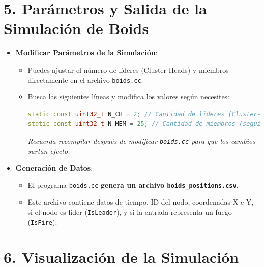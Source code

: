 \documentclass{article}
\begin{document}
\section*{\textbf{5. Parámetros y Salida de la Simulación de Boids}}

\begin{itemize}
    \item \textbf{Modificar Parámetros de la Simulación}:
    \begin{itemize}
        \item Puedes ajustar el número de líderes (Cluster-Heads) y miembros directamente en el archivo \texttt{boids.cc}.
        \item Busca las siguientes líneas y modifica los valores según necesites:
        \begin{lstlisting}[language=C++]
static const uint32_t N_CH = 2; // Cantidad de lideres (Cluster-Heads) 
static const uint32_t N_MEM = 25; // Cantidad de miembros (seguidores)
        \end{lstlisting}
        \textit{Recuerda recompilar después de modificar \texttt{boids.cc} para que los cambios surtan efecto.}
    \end{itemize}
    \item \textbf{Generación de Datos}:
    \begin{itemize}
        \item El programa \texttt{boids.cc} \textbf{genera un archivo \texttt{boids\_positions.csv}}.
        \item Este archivo contiene datos de tiempo, ID del nodo, coordenadas X e Y, si el nodo es líder (\texttt{IsLeader}), y si la entrada representa un fuego (\texttt{IsFire}).
    \end{itemize}
\end{itemize}

\section*{\textbf{6. Visualización de la Simulación}}
\end{document}
